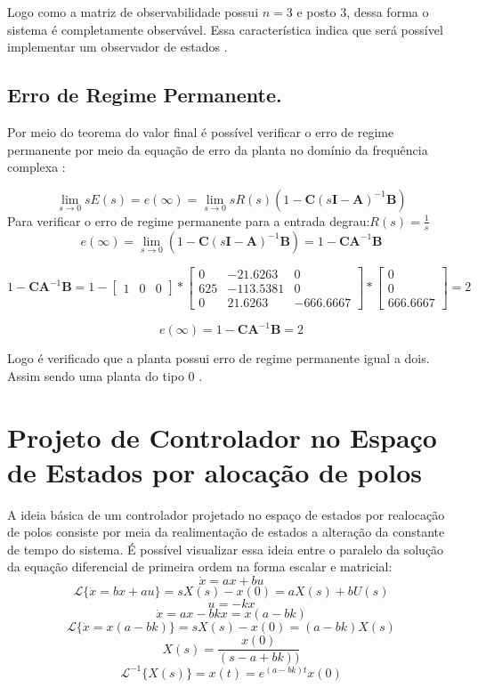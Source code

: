 \documentclass[
	article,			%
	11pt,				%
	oneside,			%
	a4paper,			%
	english,			%
	brazil,				%
	sumario=tradicional
	]{abntex2}
\begin{document}
Logo como a matriz de observabilidade possui $n=3$ e posto $3$, dessa forma o sistema é completamente observável. Essa característica indica que será possível implementar um observador de estados \cite{Ogata2014}.

\pagebreak

\subsection{Erro de Regime Permanente.}

Por meio do teorema do valor final é possível verificar o erro de regime permanente por meio da equação de erro da planta no domínio da frequência complexa \cite{lathi2014}:

$$
\lim_{s\to0} sE(s) = e(\infty)=\lim_{s\to0} sR(s)(1 - \textbf{C}(s\textbf{I}-\textbf{A})^{-1}\textbf{B})
$$
Para verificar o erro de regime permanente para a entrada degrau:$R(s)=\frac{1}{s}$
$$
e(\infty)=\lim_{s\to0} (1 - \textbf{C}(s\textbf{I}-\textbf{A})^{-1}\textbf{B}) = 1 - \textbf{C}\textbf{A}^{-1}\textbf{B}
$$

$$
1 - \textbf{C}\textbf{A}^{-1}\textbf{B} = 
1 -
\left[
\begin{array}{ccc}
1 & 0 & 0
\end{array}
\right]
*
\left[
\begin{array}{ccc}
0 & -21.6263 & 0\\
625 & -113.5381 & 0\\
0 & 21.6263 & -666.6667
\end{array}
\right]
*
\left[
\begin{array}{ccc}
0 \\
0 \\
666.6667
\end{array}
\right]
= 
2
$$

$$
e(\infty)=1 - \textbf{C}\textbf{A}^{-1}\textbf{B} = 2
$$

Logo é verificado que a planta possui erro de regime permanente igual a dois. Assim sendo uma planta do tipo 0 \cite{Ogata2014}.
\pagebreak

\section{\textbf{Projeto de Controlador no Espaço de Estados por alocação de polos}}

A ideia básica de um controlador projetado no espaço de estados por realocação de polos consiste por meia da realimentação de estados a alteração da constante de tempo do sistema. É possível visualizar essa ideia entre o paralelo da solução da equação diferencial de primeira ordem na forma escalar e matricial:
$$
\dot x = ax + bu
$$
$$
\mathscr{L}\{\dot x = bx + au\}=sX(s)-x(0)=aX(s)+bU(s)
$$
$$
u = -kx
$$
$$
\dot x = ax - bkx = x(a - bk)
$$
$$
\mathscr{L}\{\dot x = x(a - bk)\}=sX(s)-x(0)=(a - bk)X(s)
$$
$$
X(s)=\frac{x(0)}{(s-a + bk))}
$$
$$
\mathscr{L}^{-1}\{X(s)\}=x(t)=e^{(a-bk)t}x(0)
$$
\end{document}
